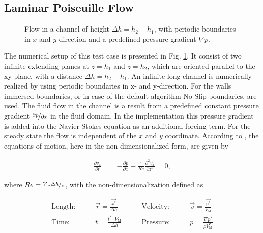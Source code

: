 \subsection{Laminar Poiseuille Flow}
\label{vali:sec_lpflow_setup}

\begin{figure}[!bp]
  \begin{minipage}[c]{0.6\textwidth}
      \centering
  \end{minipage}
  \begin{minipage}[c]{0.3\textwidth}
      \caption{Flow in a channel of height $\Delta h = h_2 - h_1$, with periodic boundaries in $x$ and $y$ direction and
       a predefined pressure gradient $\nabla p$.
      \label{validation:setup_pf}
      }
  \end{minipage}
\end{figure}

The numerical setup of this test case is presented in Fig. \ref{validation:setup_pf}.
It consist of two infinite extending  planes at $z=h_1$ and $z=h_2$, which are oriented
parallel to the xy-plane, with a distance $\Delta h = h_2 - h_1$.
An infinite long channel is numerically realized by using periodic boundaries in x- and y-direction.
For the walls immersed boundaries, or in case of the default algorithm No-Slip boundaries, are used.
The fluid flow in the channel is a result from a predefined constant pressure gradient $\nicefrac{\partial p}{\partial x}$
in the fluid domain.
In the implementation this pressure gradient is added into the Navier-Stokes equation as an additional forcing term.
For the steady state the flow is independent of the $x$ and $y$ coordinate.
According to \citep{Kundu2012}, the equations of motion, here in the non-dimensionalized form, are given by

\begin{align}
    \label{vali:pflow_navstok}
    \frac{\partial v_x}{\partial t} &= - \frac{\partial p}{\partial x}
     + \frac{1}{Re} \frac{\partial^2 v_x}{\partial z^2} = 0,
\end{align}

where $Re = \nicefrac{V_{m}\Delta h}{\nu}$, with the non-dimensionalization defined as

\begin{align}
    \text{Length:}\qquad &  \vec{r} = \frac{\vec{r^*}}{\Delta h}  &
    \qquad \text{Velocity:}\qquad& \vec{v} =  \frac{\vec{v^*}}{V_{\text{M}}}\\
    \text{Time:}  \qquad & t = \frac{t^* \cdot V_\text{M}}{\Delta h}&
    \qquad  \text{Pressure:}\qquad & p = \frac{\nabla p^*}{\rho V_\text{M}^2}
\end{align}

